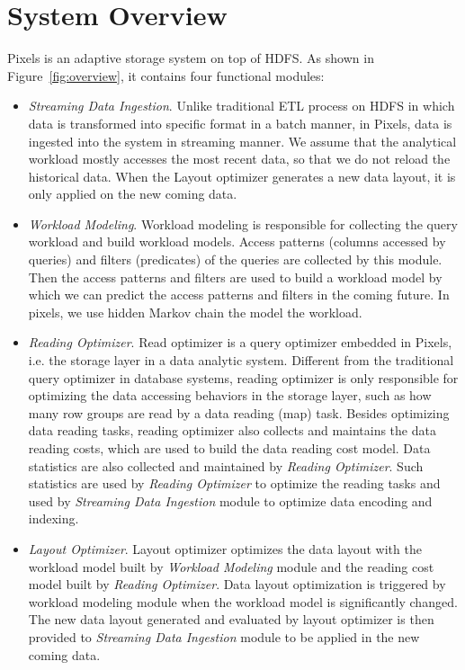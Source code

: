 \section{System Overview}

Pixels is an adaptive storage system on top of HDFS.
As shown in Figure~\ref{fig:overview}, it contains four functional modules:
\begin{itemize}
	\item \textit{Streaming Data Ingestion}. Unlike traditional ETL process on HDFS in which data is transformed into specific format in a batch manner, in Pixels, data is ingested into the system in streaming manner. We assume that the analytical workload mostly accesses the most recent data, so that we do not reload the historical data. When the Layout optimizer generates a new data layout, it is only applied on the new coming data.
	
	\item \textit{Workload Modeling}. Workload modeling is responsible for collecting the query workload and build workload models. Access patterns (columns accessed by queries) and filters (predicates) of the queries are collected by this module.
	Then the access patterns and filters are used to build a workload model by which we can predict the access patterns and filters in the coming future. In pixels, we use hidden Markov chain the model the workload.
	
	\item \textit{Reading Optimizer}. Read optimizer is a query optimizer embedded in Pixels, i.e. the storage layer in a data analytic system. Different from the traditional query optimizer in database systems, reading optimizer is only responsible for optimizing the data accessing behaviors in the storage layer, such as how many row groups are read by a data reading (map) task.
	Besides optimizing data reading tasks, reading optimizer also collects and maintains the data reading costs, which are used to build the data reading cost model. Data statistics are also collected and maintained by \textit{Reading Optimizer}. Such statistics are used by \textit{Reading Optimizer} to optimize the reading tasks and used by \textit{Streaming Data Ingestion} module to optimize data encoding and indexing.
	
	\item \textit{Layout Optimizer}. Layout optimizer optimizes the data layout with the workload model built by \textit{Workload Modeling} module and the reading cost model built by \textit{Reading Optimizer}. Data layout optimization is triggered by workload modeling module when the workload model is significantly changed. The new data layout generated and evaluated by layout optimizer is then provided to \textit{Streaming Data Ingestion} module to be applied in the new coming data.
	
\end{itemize}



